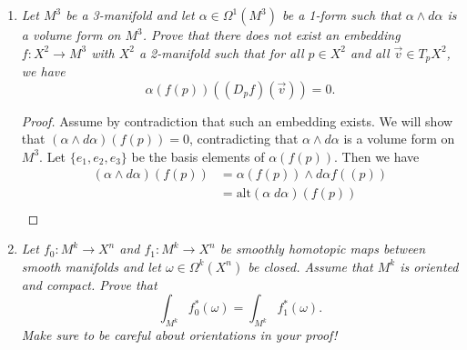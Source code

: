 \documentclass{article}
\begin{document}
\begin{enumerate}[label={\bf Q\arabic*:}]
\begin{proof}
      Let $v_1,\ldots,v_n$ be a basis of the tangent space $T_eG$. Then the
      $n$ vector fields $dL_g(v_1),\ldots,dL_g(v_n)\in T_gG$ are linearly
      independent at $g\in M$: First, note that each $dL_g(v_i)$ is a smooth
      vector field from the smoothness of the group operations. Now since
      $L_g$ is a diffeomorphism, $dL_g$ is an isomorphism. Then since
      $v_1,\ldots,v_n$ form a basis of $T_eG$, their images
      $dL_g(v_1),\ldots,dL_g(v_n)$ form a basis of $T_gG$. \\

      So the map $\phi:G\times \mathbb{R}^n\rightarrow TG$ defined by
      $\phi((g,V))=(g,dL_g)_e(V)$ is a smooth vector-bundle isomorphism,
      thus $TG\cong G\times\mathbb{R}^n$.
    \end{proof}

  \item \it Let $M^3$ be a 3-manifold and let $\alpha\in\Omega^1(M^3)$ be a
    1-form such that $\alpha\wedge d\alpha$ is a volume form on $M^3$.
    Prove that there does not exist an embedding $f:X^2\rightarrow M^3$
    with $X^2$ a 2-manifold such that for all $p\in X^2$ and all
    $\vec{v}\in T_pX^2$, we have
    \[\alpha(f(p))((D_pf)(\vec{v}))=0.\]

    \begin{proof}
      Assume by contradiction that such an embedding exists. We will show
      that $(\alpha\wedge d\alpha)(f(p))=0$, contradicting that $\alpha\wedge
      d\alpha$ is a volume form on $M^3$. Let $\{e_1,e_2,e_3\}$ be the
      basis elements of $\alpha(f(p))$. Then we have
      \begin{align*}
        (\alpha\wedge d\alpha)(f(p)) &=\alpha(f(p))\wedge d\alpha f((p)) \\
        &=\text{alt}(\alpha\; d\alpha)(f(p)) \\
      \end{align*}
    \end{proof}

  \item \it Let $f_0:M^k\rightarrow X^n$ and $f_1:M^k\rightarrow X^n$ be
    smoothly homotopic maps between smooth manifolds and let
    $\omega\in\Omega^k(X^n)$ be closed. Assume that $M^k$ is oriented and
    compact. Prove that
    \[\int_{M^k} f_0^*(\omega)= \int_{M^k} f_1^*(\omega).\]
    Make sure to be careful about orientations in your proof!


\end{enumerate}
\end{document}
